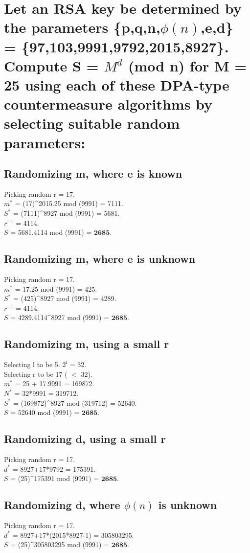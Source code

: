 \documentclass[11pt, pdftex]{article}
\begin{document}
\section{Let an RSA key be determined by the parameters \{p,q,n,$\phi(n)$,e,d\} = \{97,103,9991,9792,2015,8927\}. Compute S = $M^{d}$ (mod n) for M = 25 using each of these DPA-type countermeasure algorithms by selecting suitable random parameters:}
\subsection{Randomizing m, where e is known}
Picking random r = 17.\\
$m^{*}$ = (17)^{2015}.25 mod (9991) = 7111.\\
$S^{*}$ = (7111)^{8927} mod (9991) = 5681. \\
$r^{-1}$ = 4114.\\
$S$ = 5681.4114 mod (9991) = $\textbf{2685}$.
\subsection{Randomizing m, where e is unknown}
Picking random r = 17.\\
$m^{*}$ = 17.25 mod (9991) = 425.\\
$S^{*}$ = (425)^{8927} mod (9991) = 4289. \\
$r^{-1}$ = 4114.\\
$S$ = 4289.4114^{8927} mod (9991) = $\textbf{2685}$.
\subsection{Randomizing m, using a small r}
Selecting l to be 5. $2^{l}$ = 32.\\
Selecting r to be 17 ( $<$ 32).\\
$m^{*}$ = 25 + 17.9991 = 169872.\\
$N^{*}$ = 32*9991 = 319712.\\
$S^{*}$ = (169872)^{8927} mod (319712) = 52640. \\
$S$ = 52640 mod (9991) = $\textbf{2685}$.
\subsection{Randomizing d, using a small r}
Picking random r = 17.\\
$d^{*}$ = 8927+17*9792 = 175391.\\
$S$ = (25)^{175391} mod (9991) = $\textbf{2685}$. 
\subsection{Randomizing d, where $\phi(n)$ is unknown}
Picking random r = 17.\\
$d^{*}$ = 8927+17*(2015*8927-1) = 305803295.\\
$S$ = (25)^{305803295} mod (9991) = $\textbf{2685}$. 
\end{document}
